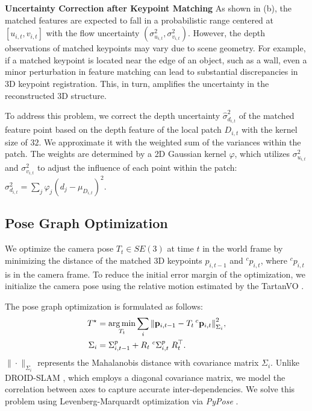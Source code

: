 \textbf{Uncertainty Correction after Keypoint Matching}\;
As shown in  (b), the matched features are expected to fall in a probabilistic range centered at $[u_{i, t}, v_{i, t}]$ with the flow uncertainty $(\sigma_{u_{i, t}}^2, \sigma_{v_{i, t}}^2)$. However, the depth observations of matched keypoints may vary due to scene geometry.
For example, if a matched keypoint is located near the edge of an object, such as a wall, even a minor perturbation in feature matching can lead to substantial discrepancies in 3D keypoint registration. This, in turn, amplifies the uncertainty in the reconstructed 3D structure.

To address this problem, we correct the depth uncertainty $\hat{\sigma}_{d_{i, t}}^2$ of the matched feature point based on the depth feature of the local patch $D_{i,t}$ with the kernel size of $32$. 
We approximate it with the weighted sum of the variances within the patch. The weights are determined by a 2D Gaussian kernel $\varphi$, which utilizes $\sigma_{u_{i, t}}^2$ and $\sigma_{v_{i, t}}^2$ to adjust the influence of each point within the patch:
$\sigma_{d_{i, t}}^2 = \sum_j{\varphi_j (d_j - \mu_{{D}_{i, t}})^2}.$ 
\vspace{4pt}

\subsection{Pose Graph Optimization}
\label{Method: Optimization}

We optimize the camera pose  $T_{t}\in SE(3)$ at time $t$ in the world frame by minimizing the distance of the matched 3D keypoints $p_{i, t-1}$ and ${}^cp_{i, t}$, where ${}^cp_{i, t}$ is in the camera frame.
To reduce the initial error margin of the optimization, we initialize the camera pose using the relative motion estimated by the TartanVO \cite{tartanvo2020corl}.

The pose graph optimization is formulated as follows:
\begin{equation}
\begin{aligned}
    T^\star &= \operatorname*{arg\,min}_{T_t}{\sum_{i}{\left\| \mathbf{p}_{i, t-1} - {T}_{t}\, {}^c\mathbf{p}_{i, t} \right\|^2_{\Sigma_i}}}, \\
    \Sigma_{i} &= \Sigma_{i, t-1}^p + R_t\;{}^c\Sigma_{i, t}^p\;R_t^\top.
\end{aligned}
\end{equation}
$\|\cdot\|_{\Sigma_i}$ represents the Mahalanobis distance with covariance matrix $\Sigma_i$.
Unlike DROID-SLAM \cite{teed2021droid}, which employs a diagonal covariance matrix, we model the correlation between axes to capture accurate inter-dependencies.
We solve this problem using Levenberg-Marquardt optimization via \textit{PyPose} \cite{wang2023pypose, zhan2023pypose}.


